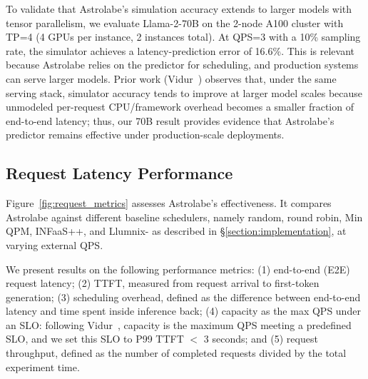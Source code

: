 \documentclass[sigconf, review, anonymous]{acmart}
\begin{document}
To validate that Astrolabe's simulation accuracy extends to larger models with tensor parallelism, we evaluate Llama-2-70B on the 2-node A100 cluster with TP=4 (4 GPUs per instance, 2 instances total). At QPS=3 with a 10\% sampling rate, the simulator achieves a latency-prediction error of 16.6\%. This is relevant because Astrolabe relies on the predictor for scheduling, and production systems can serve larger models. Prior work (Vidur~\cite{vidur}) observes that, under the same serving stack, simulator accuracy tends to improve at larger model scales because unmodeled per-request CPU/framework overhead becomes a smaller fraction of end-to-end latency; thus, our 70B result provides evidence that Astrolabe's predictor remains effective under production-scale deployments.



\subsection{Request Latency Performance} \label{section:request_performance}
Figure~\ref{fig:request_metrics} assesses Astrolabe's effectiveness. It compares Astrolabe against different baseline schedulers, namely random, round robin, Min QPM, INFaaS++, and Llumnix- as described in \S\ref{section:implementation}, at varying external QPS.

We present results on the following performance metrics: (1) end-to-end (E2E) request latency; (2) TTFT, measured from request arrival to first-token generation; (3) scheduling overhead, defined as the difference between end-to-end latency and time spent inside inference back; (4) capacity as the max QPS under an SLO: following Vidur~\cite{vidur}, capacity is the maximum QPS meeting a predefined SLO, and we set this SLO to P99 TTFT $<$ 3 seconds; and (5) request throughput, defined as the number of completed requests divided by the total experiment time.
\end{document}
